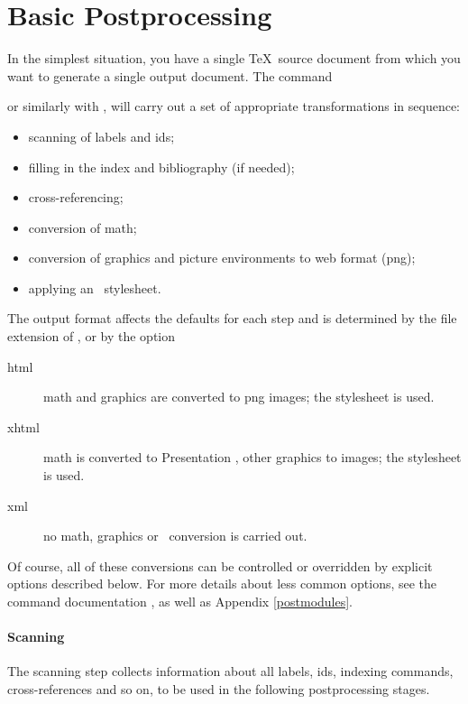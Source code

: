 \documentclass{report}
\begin{document}
\section[Postprocessing]{Basic Postprocessing}\label{usage.single}
In the simplest situation, you have a single \TeX\ source document
from which you want to generate a single output document.
The command
\begin{quote}
\end{quote}
or similarly with ,
will carry out a set of appropriate transformations in sequence:
\begin{itemize}
  \item scanning of labels and ids;
  \item filling in the index and bibliography (if needed);
  \item cross-referencing;
  \item conversion of math;
  \item conversion of graphics and picture environments to web format (png);
  \item applying an \XSLT\ stylesheet.
\end{itemize}
The output format affects the defaults for each step and is determined
by the file extension of , or by the option
\begin{quote}
\end{quote}
\begin{description}
 \item[html] math and graphics are converted to png images;
    the  stylesheet is used.
 \item[xhtml] math is converted to Presentation \MathML, other graphics to images;
    the  stylesheet is used.
 \item[xml] no math, graphics or \XSLT\ conversion is carried out.
\end{description}
Of course, all of these conversions can be controlled or overridden
by explicit options described below.
For more details about less common options, see the command
documentation , as well as Appendix \ref{postmodules}.

\paragraph{Scanning}
The scanning step collects information about all labels, ids,
indexing commands, cross-references and so on, to be used
in the following postprocessing stages.
\end{document}
